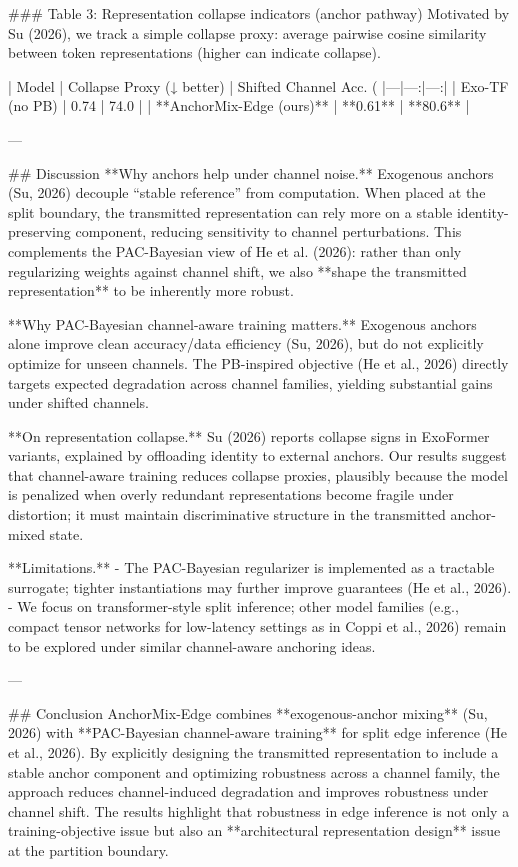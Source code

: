 ### Table 3: Representation collapse indicators (anchor pathway)  
Motivated by Su (2026), we track a simple collapse proxy: average pairwise cosine similarity between token representations (higher can indicate collapse).

| Model | Collapse Proxy (↓ better) | Shifted Channel Acc. (%
|---|---:|---:|
| Exo-TF (no PB) | 0.74 | 74.0 |
| **AnchorMix-Edge (ours)** | **0.61** | **80.6** |

---

## Discussion  
**Why anchors help under channel noise.** Exogenous anchors (Su, 2026) decouple “stable reference” from computation. When placed at the split boundary, the transmitted representation can rely more on a stable identity-preserving component, reducing sensitivity to channel perturbations. This complements the PAC-Bayesian view of He et al. (2026): rather than only regularizing weights against channel shift, we also **shape the transmitted representation** to be inherently more robust.

**Why PAC-Bayesian channel-aware training matters.** Exogenous anchors alone improve clean accuracy/data efficiency (Su, 2026), but do not explicitly optimize for unseen channels. The PB-inspired objective (He et al., 2026) directly targets expected degradation across channel families, yielding substantial gains under shifted channels.

**On representation collapse.** Su (2026) reports collapse signs in ExoFormer variants, explained by offloading identity to external anchors. Our results suggest that channel-aware training reduces collapse proxies, plausibly because the model is penalized when overly redundant representations become fragile under distortion; it must maintain discriminative structure in the transmitted anchor-mixed state.

**Limitations.**  
- The PAC-Bayesian regularizer is implemented as a tractable surrogate; tighter instantiations may further improve guarantees (He et al., 2026).  
- We focus on transformer-style split inference; other model families (e.g., compact tensor networks for low-latency settings as in Coppi et al., 2026) remain to be explored under similar channel-aware anchoring ideas.

---

## Conclusion  
AnchorMix-Edge combines **exogenous-anchor mixing** (Su, 2026) with **PAC-Bayesian channel-aware training** for split edge inference (He et al., 2026). By explicitly designing the transmitted representation to include a stable anchor component and optimizing robustness across a channel family, the approach reduces channel-induced degradation and improves robustness under channel shift. The results highlight that robustness in edge inference is not only a training-objective issue but also an **architectural representation design** issue at the partition boundary.

